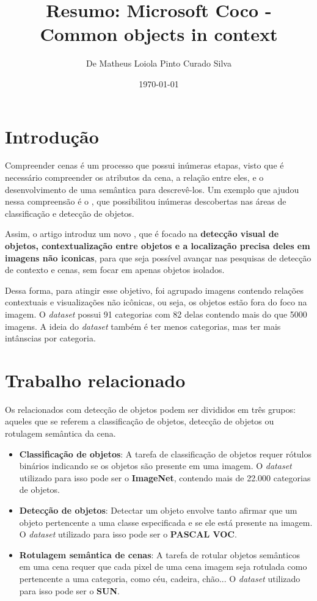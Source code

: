 \documentclass[12pt]{article}
\title{Resumo: Microsoft Coco - Common objects in context}
\author{De Matheus Loiola Pinto Curado Silva}
\date{\today}
\begin{document}
	
\maketitle

\section*{Introdução}

Compreender cenas é um processo que possui inúmeras etapas, visto que é necessário compreender os atributos da cena, a relação entre eles, e o desenvolvimento de uma semântica para descrevê-los. Um exemplo que ajudou nessa compreensão é o , que possibilitou inúmeras descobertas nas áreas de classificação e detecção de objetos. 

Assim, o artigo introduz um novo , que é focado na \textbf{detecção visual de objetos, contextualização entre objetos e a localização precisa deles em imagens não iconicas}, para que seja possível avançar nas pesquisas de detecção de contexto e cenas, sem focar em apenas objetos isolados.

Dessa forma, para atingir esse objetivo, foi agrupado imagens contendo relações contextuais e visualizações não icônicas, ou seja, os objetos estão fora do foco na imagem. O \textit{dataset} possui 91 categorias com 82 delas contendo mais do que 5000 imagens. A ideia do \textit{dataset} também é ter menos categorias, mas ter mais intânscias por categoria.

\section*{Trabalho relacionado}

Os  relacionados com detecção de objetos podem ser divididos em três grupos: aqueles que se referem a classificação de objetos, detecção de objetos ou rotulagem semântica da cena.

\begin{itemize}
    \item
    \textbf{Classificação de objetos}: A tarefa de classificação de objetos
    requer rótulos binários indicando se os objetos são presente em uma imagem. O \textit{dataset} utilizado para isso pode ser o \textbf{ImageNet}, contendo mais de 22.000 categorias de objetos.

    \item
    \textbf{Detecção de objetos}: Detectar um objeto envolve tanto afirmar que um objeto pertencente a uma classe especificada e se ele está presente na imagem. O \textit{dataset} utilizado para isso pode ser o 
    \textbf{PASCAL VOC}.

    \item
    \textbf{Rotulagem semântica de cenas}: A tarefa de rotular objetos semânticos em uma cena requer que cada pixel de uma cena imagem seja rotulada como pertencente a uma categoria, como céu, cadeira, chão...
    O \textit{dataset} utilizado para isso pode ser o \textbf{SUN}.
\end{itemize}
\end{document}
